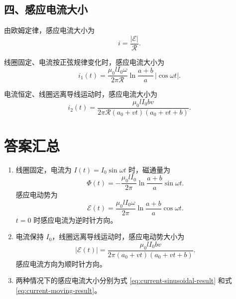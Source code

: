 \documentclass[11pt,a4paper,fontset=fandol]{ctexart}
\newcommand{\emf}{\mathcal{E}}
\begin{document}
\subsection*{四、感应电流大小}
由欧姆定律，感应电流大小为
\begin{equation}
 i=\frac{|\emf|}{\mathcal R}.
 \label{eq:ohm-law}
\end{equation}

线圈固定、电流按正弦规律变化时，感应电流大小为
\begin{equation}
 i_1(t)=\frac{\mu_0 l I_0\omega}{2\pi\mathcal R}\ln\frac{a+b}{a}\,|\cos\omega t|.
 \label{eq:current-sinusoidal-result}
\end{equation}

电流恒定、线圈远离导线运动时，感应电流大小为
\begin{equation}
 i_2(t)=\frac{\mu_0 l I_0 b v}{2\pi\mathcal R (a_0+vt)(a_0+vt+b)}.
 \label{eq:current-moving-result}
\end{equation}

\section*{答案汇总}
\begin{ideaBox}
\begin{enumerate}
 \item 线圈固定，电流为 $I(t)=I_0\sin\omega t$ 时，磁通量为
 \[
 \Phi(t)=-\frac{\mu_0 l I_0}{2\pi}\ln\frac{a+b}{a}\sin\omega t.
 \]
 感应电动势为
 \[
 \emf(t)=\frac{\mu_0 l I_0\omega}{2\pi}\ln\frac{a+b}{a}\cos\omega t.
 \]
 $t=0$ 时感应电流为逆时针方向。
 \item 电流保持 $I_0$，线圈远离导线运动时，感应电动势大小为
 \[
 |\emf(t)|=\frac{\mu_0 l I_0 b v}{2\pi (a_0+vt)(a_0+vt+b)}.
 \]
 感应电流方向为顺时针方向。
 \item 两种情况下的感应电流大小分别为式 \eqref{eq:current-sinusoidal-result} 和式 \eqref{eq:current-moving-result}。
\end{enumerate}
\end{ideaBox}
\end{document}
